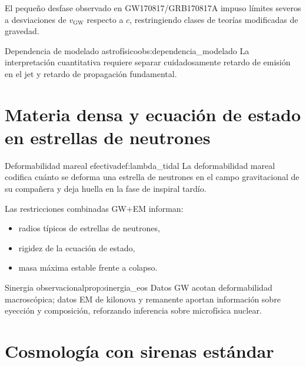 El pequeño desfase observado en GW170817/GRB170817A impuso límites severos a desviaciones de $v_{\mathrm{GW}}$ respecto a $c$, restringiendo clases de teorías modificadas de gravedad.

\begin{observacion}{Dependencia de modelado astrofísico}{obs:dependencia_modelado}
La interpretación cuantitativa requiere separar cuidadosamente retardo de emisión en el jet y retardo de propagación fundamental.
\end{observacion}

\section{Materia densa y ecuación de estado en estrellas de neutrones}
\label{sec:eos_materia_densa}

\begin{definicion}{Deformabilidad mareal efectiva}{def:lambda_tidal}
La deformabilidad mareal codifica cuánto se deforma una estrella de neutrones en el campo gravitacional de su compañera y deja huella en la fase de inspiral tardío.
\end{definicion}

Las restricciones combinadas GW+EM informan:
\begin{itemize}[leftmargin=2em]
  \item radios típicos de estrellas de neutrones,
  \item rigidez de la ecuación de estado,
  \item masa máxima estable frente a colapso.
\end{itemize}

\begin{proposicion}{Sinergia observacional}{prop:sinergia_eos}
Datos GW acotan deformabilidad macroscópica; datos EM de kilonova y remanente aportan información sobre eyección y composición, reforzando inferencia sobre microfísica nuclear.
\end{proposicion}

\section{Cosmología con sirenas estándar}
\label{sec:cosmologia_sirenas_estandar}

